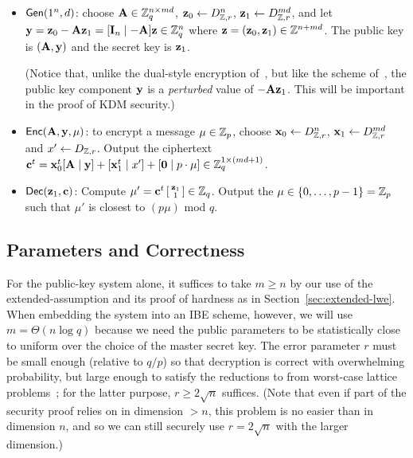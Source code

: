 \begin{itemize}[itemsep=0pt]
\item $\mathsf{Gen}(1^n, d)$: choose $\mathbf{A} \in \mathbb{Z}_q^{n \times md}$,
  $\mathbf{z}_{0} \gets D_{\mathbb{Z},r}^{n}$, $\mathbf{z}_{1} \gets D_{\mathbb{Z},
    r}^{md}$, and let $\mathbf{y} = \mathbf{z}_{0}-\mathbf{A}\mathbf{z}_{1} = [\mathbf{I}_{n}
  \mid -\mathbf{A}] \mathbf{z} \in \mathbb{Z}_q^{n}$ where $\mathbf{z}=(\mathbf{z}_{0}, \mathbf{z}_{1})
  \in \mathbb{Z}^{n+md}$.  The public key is $(\mathbf{A}, \mathbf{y})$ and the secret
  key is $\mathbf{z}_{1}$.

  (Notice that, unlike the dual-style encryption
  of~\cite{DBLP:conf/stoc/GentryPV08}, but like the scheme
  of~\cite{DBLP:conf/ctrsa/LindnerP11}, the public key component
  $\mathbf{y}$ is a \emph{perturbed} value of $-\mathbf{A} \mathbf{z}_{1}$.  This
  will be important in the proof of KDM security.)
 
\item $\mathsf{Enc}(\mathbf{A}, \mathbf{y}, \mu)$: to encrypt a message $\mu \in
  \mathbb{Z}_p$, choose $\mathbf{x}_{0} \gets D_{\mathbb{Z},r}^{n}$, $\mathbf{x}_{1} \gets
  D_{\mathbb{Z}, r}^{md}$ and $x' \gets D_{\mathbb{Z}, r}$.  Output the
  ciphertext $\mathbf{c}^t =\mathbf{x}_{0}^t[\mathbf{A} \mid \mathbf{y}] + [\mathbf{x}_{1}^t
  \mid x'] + [\mathbf{0} \mid p\cdot\mu] \in \mathbb{Z}_q^{1 \times (md+1)}$.

\item $\mathsf{Dec}(\mathbf{z}_{1}, \mathbf{c})$: Compute $\mu' = \mathbf{c}^t \left[
    \begin{smallmatrix}
      \mathbf{z}_{1} \\ 1
    \end{smallmatrix} \right] \in \mathbb{Z}_q$.  Output the $\mu \in \{{0,
    \ldots, p-1}\} = \mathbb{Z}_p$ such that $\mu'$ is closest to $(p \mu)$ mod
  $q$.
\end{itemize}

\subsection{Parameters and Correctness}

For the public-key system alone, it suffices to take $m \geq n$ by our
use of the extended-\lwe assumption and its proof of hardness as in
Section~\ref{sec:extended-lwe}.  When embedding the system into an IBE
scheme, however, we will use $m=\Theta(n \log q)$ because we need the
public parameters to be statistically close to uniform over the choice
of the master secret key.  The error parameter $r$ must be small
enough (relative to $q/p$) so that decryption is correct with
overwhelming probability, but large enough to satisfy the reductions
to \lwe from worst-case lattice
problems~\cite{DBLP:journals/jacm/Regev09,DBLP:conf/stoc/Peikert09};
for the latter purpose, $r \geq 2\sqrt{n}$ suffices.  (Note that even
if part of the security proof relies on \lwe in dimension $> n$, this
problem is no easier than \lwe in dimension $n$, and so we can still
securely use $r=2\sqrt{n}$ with the larger dimension.)

